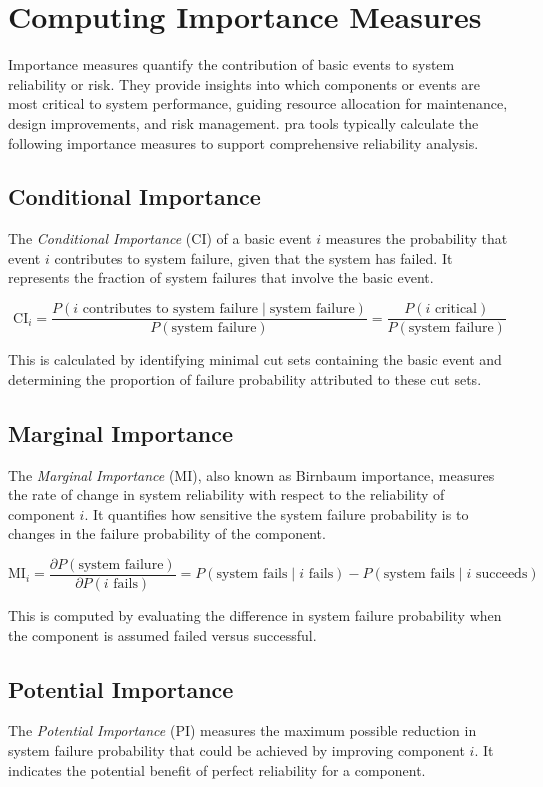 \section{Computing Importance Measures}
\label{sec:foundations_importance}
Importance measures quantify the contribution of basic events to system reliability or risk. They provide insights into which components or events are most critical to system performance, guiding resource allocation for maintenance, design improvements, and risk management. \acrshort{pra} tools typically calculate the following importance measures to support comprehensive reliability analysis.

\subsection{Conditional Importance}
The \emph{Conditional Importance} (CI) of a basic event $i$ measures the probability that event $i$ contributes to system failure, given that the system has failed. It represents the fraction of system failures that involve the basic event.

\[
\text{CI}_i = \frac{P(i \text{ contributes to system failure} \mid \text{system failure})}{P(\text{system failure})} = \frac{P(i \text{ critical})}{P(\text{system failure})}
\]

This is calculated by identifying minimal cut sets containing the basic event and determining the proportion of failure probability attributed to these cut sets.

\subsection{Marginal Importance}
The \emph{Marginal Importance} (MI), also known as Birnbaum importance, measures the rate of change in system reliability with respect to the reliability of component $i$. It quantifies how sensitive the system failure probability is to changes in the failure probability of the component.

\[
\text{MI}_i = \frac{\partial P(\text{system failure})}{\partial P(i \text{ fails})} = P(\text{system fails} \mid i \text{ fails}) - P(\text{system fails} \mid i \text{ succeeds})
\]

This is computed by evaluating the difference in system failure probability when the component is assumed failed versus successful.

\subsection{Potential Importance}
The \emph{Potential Importance} (PI) measures the maximum possible reduction in system failure probability that could be achieved by improving component $i$. It indicates the potential benefit of perfect reliability for a component.

